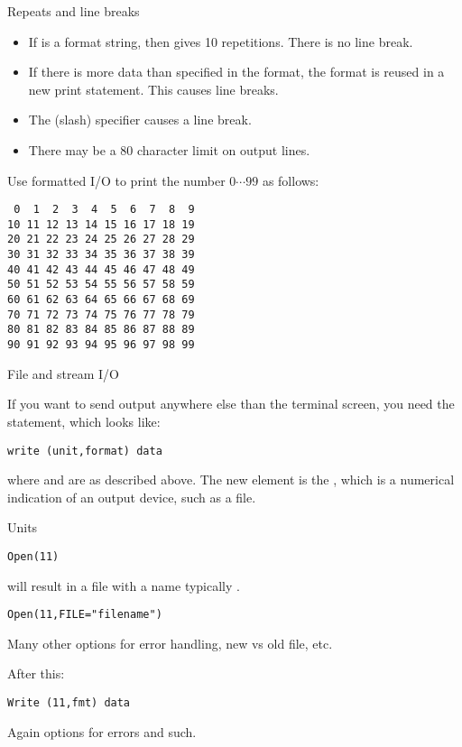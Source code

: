\begin{block}{Repeats and line breaks}
  \label{sl:formatrepeat}
  \begin{itemize}
  \item If  is a format string, then  gives 10
    repetitions. There is no line break.
  \item If there is more data than specified in the format, the format
    is reused in a new print statement. This causes line breaks.
  \item The \n{/} (slash) specifier causes a line break.
  \item There may be a 80 character limit on output lines.
  \end{itemize}
\end{block}

\begin{exercise}
  \label{ex:f99}
  Use formatted I/O to print the number $0\cdots99$ as follows:
\begin{lstlisting}
 0  1  2  3  4  5  6  7  8  9
10 11 12 13 14 15 16 17 18 19
20 21 22 23 24 25 26 27 28 29
30 31 32 33 34 35 36 37 38 39
40 41 42 43 44 45 46 47 48 49
50 51 52 53 54 55 56 57 58 59
60 61 62 63 64 65 66 67 68 69
70 71 72 73 74 75 76 77 78 79
80 81 82 83 84 85 86 87 88 89
90 91 92 93 94 95 96 97 98 99
\end{lstlisting}
\end{exercise}

 {File and stream I/O}

If you want to send output anywhere else than the terminal screen, you
need the  statement, which looks like:
\begin{lstlisting}
write (unit,format) data
\end{lstlisting}
where  and  are as described above. The new element
is the , which is a numerical indication of an output
device, such as a file.

 {Units}

\begin{lstlisting}
Open(11)
\end{lstlisting}
will result in a file with a name typically .
\begin{lstlisting}
Open(11,FILE="filename")
\end{lstlisting}
Many other options for error handling, new vs old file, etc.

After this:
\begin{lstlisting}
Write (11,fmt) data
\end{lstlisting}
Again options for errors and such.

